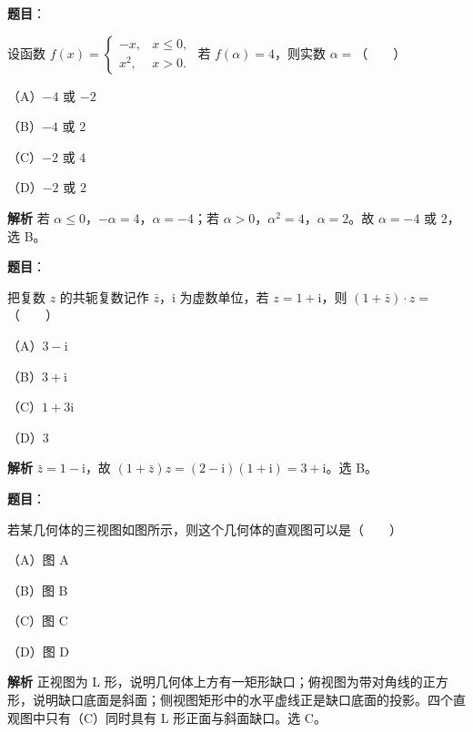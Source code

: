 
\begin{answer}

\textbf{题目}：

设函数 $f(x)=\begin{cases}-x,&x\leqslant0,\\x^2,&x>0.\end{cases}$ 若 $f(\alpha)=4$，则实数 $\alpha=$\mbox{（　　）}

（A）$-4$ 或 $-2$

（B）$-4$ 或 $2$

（C）$-2$ 或 $4$

（D）$-2$ 或 $2$

\textbf{解析}
若 $\alpha\leqslant0$，$-\alpha=4$，$\alpha=-4$；若 $\alpha>0$，$\alpha^2=4$，$\alpha=2$。故 $\alpha=-4$ 或 $2$，选 B。


\end{answer}
\begin{answer}

\textbf{题目}：

把复数 $z$ 的共轭复数记作 $\bar z$，$\mathrm i$ 为虚数单位，若 $z=1+\mathrm i$，则 $(1+\bar z)\cdot z=$\mbox{（　　）}

（A）$3-\mathrm i$

（B）$3+\mathrm i$

（C）$1+3\mathrm i$

（D）$3$

\textbf{解析}
$\bar z=1-\mathrm i$，故 $(1+\bar z)z=(2-\mathrm i)(1+\mathrm i)=3+\mathrm i$。选 B。


\end{answer}
\begin{answer}

\textbf{题目}：

若某几何体的三视图如图所示，则这个几何体的直观图可以是\mbox{（　　）}

（A）图 A

（B）图 B

（C）图 C

（D）图 D
\nopagebreak[4]
\begin{center}\end{center}
\nopagebreak[4]
\textbf{解析}
正视图为 L 形，说明几何体上方有一矩形缺口；俯视图为带对角线的正方形，说明缺口底面是斜面；侧视图矩形中的水平虚线正是缺口底面的投影。四个直观图中只有（C）同时具有 L 形正面与斜面缺口。选 C。


\end{answer}
